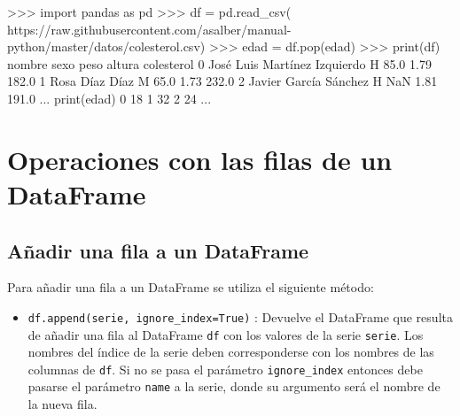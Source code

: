 \documentclass[
  spanish,
  a4paper,
]{scrreport}
\newenvironment{Shaded}{\begin{snugshade}}{\end{snugshade}}
\newcommand{\BuiltInTok}[1]{\textcolor[rgb]{0.00,0.23,0.31}{#1}}
\newcommand{\DecValTok}[1]{\textcolor[rgb]{0.68,0.00,0.00}{#1}}
\newcommand{\FloatTok}[1]{\textcolor[rgb]{0.68,0.00,0.00}{#1}}
\newcommand{\ImportTok}[1]{\textcolor[rgb]{0.00,0.46,0.62}{#1}}
\newcommand{\NormalTok}[1]{\textcolor[rgb]{0.00,0.23,0.31}{#1}}
\newcommand{\OperatorTok}[1]{\textcolor[rgb]{0.37,0.37,0.37}{#1}}
\newcommand{\StringTok}[1]{\textcolor[rgb]{0.13,0.47,0.30}{#1}}
\providecommand{\tightlist}{%
  \setlength{\itemsep}{0pt}\setlength{\parskip}{0pt}}
\begin{document}
\begin{Shaded}
\begin{Highlighting}[]
\OperatorTok{\textgreater{}\textgreater{}\textgreater{}} \ImportTok{import}\NormalTok{ pandas }\ImportTok{as}\NormalTok{ pd}
\OperatorTok{\textgreater{}\textgreater{}\textgreater{}}\NormalTok{ df }\OperatorTok{=}\NormalTok{ pd.read\_csv(}
\StringTok{\textquotesingle{}https://raw.githubusercontent.com/asalber/manual{-}python/master/datos/colesterol.csv\textquotesingle{}}\NormalTok{)}
\OperatorTok{\textgreater{}\textgreater{}\textgreater{}}\NormalTok{ edad }\OperatorTok{=}\NormalTok{ df.pop(}\StringTok{\textquotesingle{}edad\textquotesingle{}}\NormalTok{)}
\OperatorTok{\textgreater{}\textgreater{}\textgreater{}} \BuiltInTok{print}\NormalTok{(df)}
\NormalTok{                              nombre    sexo  peso  altura    colesterol}
\DecValTok{0}\NormalTok{       José Luis Martínez Izquierdo     H    }\FloatTok{85.0}    \FloatTok{1.79}         \FloatTok{182.0}
\DecValTok{1}\NormalTok{                     Rosa Díaz Díaz     M    }\FloatTok{65.0}    \FloatTok{1.73}         \FloatTok{232.0}
\DecValTok{2}\NormalTok{              Javier García Sánchez     H     }
\NormalTok{NaN    }\FloatTok{1.81}         \FloatTok{191.0}
\NormalTok{...}
\BuiltInTok{print}\NormalTok{(edad)}
\DecValTok{0}     \DecValTok{18}
\DecValTok{1}     \DecValTok{32}
\DecValTok{2}     \DecValTok{24}
\NormalTok{...}
\end{Highlighting}
\end{Shaded}

\section{Operaciones con las filas de un
DataFrame}\label{operaciones-con-las-filas-de-un-dataframe}

\subsection{Añadir una fila a un
DataFrame}\label{auxf1adir-una-fila-a-un-dataframe}

Para añadir una fila a un DataFrame se utiliza el siguiente método:

\begin{itemize}
\tightlist
\item
  \texttt{df.append(serie,\ ignore\_index=True)} : Devuelve el DataFrame
  que resulta de añadir una fila al DataFrame \texttt{df} con los
  valores de la serie \texttt{serie}. Los nombres del índice de la serie
  deben corresponderse con los nombres de las columnas de \texttt{df}.
  Si no se pasa el parámetro \texttt{ignore\_index} entonces debe
  pasarse el parámetro \texttt{name} a la serie, donde su argumento será
  el nombre de la nueva fila.
\end{itemize}
\end{document}

